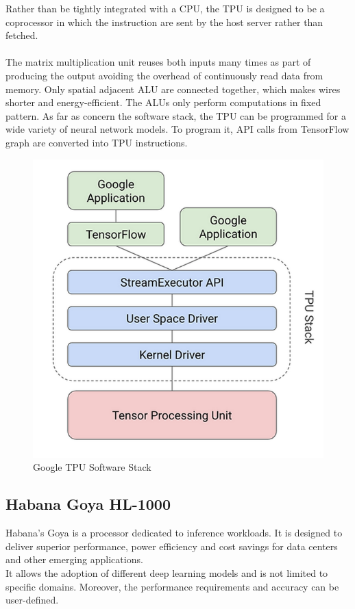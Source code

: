 Rather than be tightly integrated with a CPU, the TPU is designed to be a coprocessor in which the instruction are sent by the host server rather than fetched.\\\\
The matrix multiplication unit reuses both inputs many times as part of producing the output avoiding the overhead of continuously read data from memory. Only spatial adjacent ALU are connected together, which makes wires shorter and energy-efficient. The ALUs only perform computations in fixed pattern.
\newpage
As far as concern the software stack, the TPU can be programmed for a wide variety of neural network models. To program it, API calls from TensorFlow graph are converted into TPU instructions.
\begin{figure}[H]
\centering
\captionsetup{justification=centering}
\includegraphics[scale=0.4]{./figure/tpu_sw_stack.PNG}
\caption{Google TPU Software Stack}
\label{fig:gtpuswstack}
\end{figure}

\subsection{Habana Goya HL-1000}

Habana’s Goya is a processor dedicated to inference workloads. It is designed to deliver superior performance, power efficiency and cost savings for data centers and other emerging applications.\\
It allows the adoption of different deep learning models and is not limited to specific domains. Moreover, the performance requirements and accuracy can be user-defined.\\

